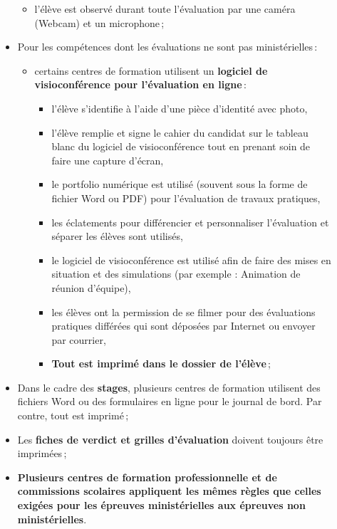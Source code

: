 \documentclass{beamer}
\begin{document}
\begin{frame}[allowframebreaks]
\begin{description}
\begin{itemize}
\begin{itemize}
								\item l'élève est observé durant toute l'évaluation par une caméra (Webcam) et un microphone\,;
							\end{itemize}
							\framebreak
							\item Pour les compétences dont les évaluations ne sont pas ministérielles\,:
							 \begin{itemize}
								\item certains centres de formation utilisent un \textbf{logiciel de visioconférence pour l'évaluation en ligne}\,:
									\begin{itemize}
										\item l'élève s'identifie à l'aide d'une pièce d'identité avec photo,
										\item l'élève remplie et signe le cahier du candidat sur le tableau blanc du logiciel de visioconférence tout en prenant soin de faire une capture d'écran,
										\item le portfolio numérique est utilisé (souvent sous la forme de fichier Word ou PDF) pour l'évaluation de travaux pratiques,
										\item les éclatements pour différencier et personnaliser l'évaluation et séparer les élèves sont utilisés,
										\item le logiciel de visioconférence est utilisé afin de faire des mises en situation et des simulations (par exemple : Animation de réunion d'équipe),
										\item les élèves ont la permission de se filmer pour des évaluations pratiques différées qui sont déposées par Internet ou envoyer par courrier,
										\item \textbf{Tout est imprimé dans le dossier de l'élève}\,;
									\end{itemize}
								\end{itemize}
							\framebreak
							\item Dans le cadre des \textbf{stages}, plusieurs centres de formation utilisent des fichiers Word ou des formulaires en ligne pour le journal de bord. Par contre, tout est imprimé\,;
							\item Les \textbf{fiches de verdict et grilles d'évaluation} doivent toujours être imprimées\,;
							\item \textbf{Plusieurs centres de formation professionnelle et de commissions scolaires appliquent les mêmes règles que celles exigées pour les épreuves ministérielles aux épreuves non ministérielles}.
					\end{itemize}

\end{description}
\end{frame}
\end{document}
